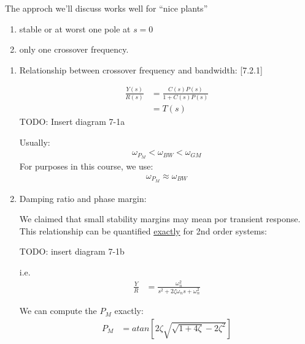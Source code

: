 \begin{enumerate}
\begin{enumerate}
\begin{itemize}
                        The approch we'll discuss works well for ``nice plants''
                        \begin{enumerate}
                            \item stable or at worst one pole at $s = 0$
                            \item only one crossover frequency.
                        \end{enumerate}
                \end{itemize}
                \begin{enumerate}
                    \item Relationship between crossover frequency and bandwidth: [7.2.1]

                        \begin{align*}
                            \frac{Y(s)}{R(s)} &= \frac{C(s)P(s)}{1+C(s)P(s)} \\
                            &= T(s)
                        \end{align*}
                        TODO: Insert diagram 7-1a

                        Usually:
                        \begin{align*}
                            \omega_{P_M} < \omega_{BW} < \omega_{GM}
                        \end{align*}
                        For purposes in this course, we use:
                        \begin{align*}
                            \omega_{P_M} \approx \omega_{BW}
                        \end{align*}
                    \item Damping ratio and phase margin:

                        We claimed that small stability margins may mean por transient response.
                        This relationship can be quantified \uline{exactly} for 2nd order systems:

                        TODO: insert diagram 7-1b

                        i.e.
                        \begin{align*}
                            \frac{Y}{R} &= \frac{\omega_n^2}{s^2 + 2 \zeta \omega_n s + \omega_n^2}
                        \end{align*}

                        We can compute the $P_M$ exactly:
                        \begin{align*}
                            P_M &= atan\left[2 \zeta \sqrt{\sqrt{1 + 4 \zeta} - 2 \zeta ^2}\right]
                        \end{align*}


\end{enumerate}
\end{enumerate}
\end{enumerate}
